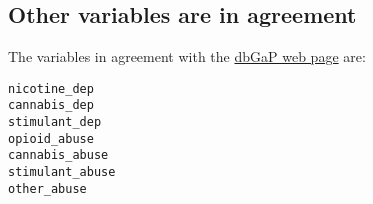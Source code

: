 \documentclass[11pt]{article}
\begin{document}
    \subsection{Other variables are in
agreement}\label{other-variables-are-in-agreement}

The variables in agreement with the
\href{https://www.ncbi.nlm.nih.gov/projects/gap/cgi-bin/dataset.cgi?study_id=phs001109.v1.p1\&phv=261892\&phd=6837\&pha=\&pht=5447\&phvf=1\&phdf=\&phaf=\&phtf=1\&dssp=1\&consent=\&temp=1}{dbGaP
web page} are:

\begin{verbatim}
nicotine_dep
cannabis_dep
stimulant_dep
opioid_abuse
cannabis_abuse
stimulant_abuse
other_abuse
\end{verbatim}


    
    
    
    
\end{document}

